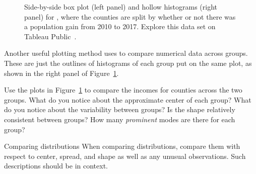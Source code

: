 \begin{figure}
  \centering
{}
  \caption{Side-by-side box plot (left panel)
      and hollow histograms (right panel) for
      ,
      where the counties are split by whether or not there was a population gain from 2010 to 2017.  Explore this data set on Tableau Public~.}
  \label{countyIncomeSplitByPopGain}
\end{figure}

Another useful plotting method uses  to compare numerical data across groups. These are just the outlines of histograms of each group put on the same plot, as shown in the right panel of Figure~\ref{countyIncomeSplitByPopGain}.

\begin{exercisewrap}
\begin{nexercise} \label{comparingPriceByTypeExercise}
Use the plots in Figure~\ref{countyIncomeSplitByPopGain}
to compare the incomes for counties across the two groups.
What do you notice about the approximate center of each group?
What do you notice about the variability between groups?
Is the shape relatively consistent between groups?
How many \emph{prominent} modes are there for each
group?\footnotemark{}
\end{nexercise}
\end{exercisewrap}

\begin{onebox}{Comparing distributions}
When comparing distributions, compare them with respect to center, spread, and shape as well as any unusual observations. Such descriptions should be in context.\end{onebox}


